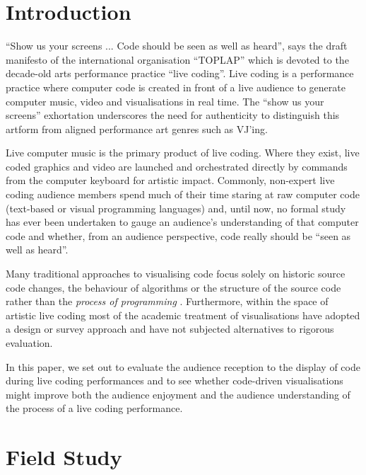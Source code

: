 \documentclass{sig-alternate}
\begin{document}



\section{Introduction}

``Show us your screens ... Code should be seen as well as heard'', says the draft manifesto of the international organisation ``TOPLAP'' \cite{Toplap} which is devoted to the decade-old arts performance practice ``live coding''. Live coding is a performance practice where computer code is created in front of a live audience to generate computer music, video and visualisations in real time. The ``show us your screens'' exhortation underscores the need for authenticity to distinguish this artform from aligned performance art genres such as VJ'ing. 

Live computer music is the primary product of live coding. Where they exist, live coded graphics and video are launched and orchestrated directly by commands from the computer keyboard for artistic impact. Commonly, non-expert live coding audience members spend much of their time staring at raw computer code (text-based or visual programming languages) and, until now, no formal study has ever been undertaken to gauge an audience's understanding of that computer code and whether, from an audience perspective, code really should be ``seen as well as heard''.

Many traditional approaches to visualising code focus solely on historic source code changes, the behaviour of algorithms or the structure of the source code rather than the {\it process of programming} \cite{Novais2013}. Furthermore, within the space of  artistic live coding most of the academic treatment of visualisations have adopted a design or survey approach \cite{McLean2010b,Magnusson2013} and have not subjected alternatives to rigorous evaluation.

In this paper, we set out to evaluate the audience reception to the display of code during live coding performances and to see whether code-driven visualisations might improve both the audience enjoyment and the audience understanding of the process of a live coding performance.

\section{Field Study}
\end{document}
